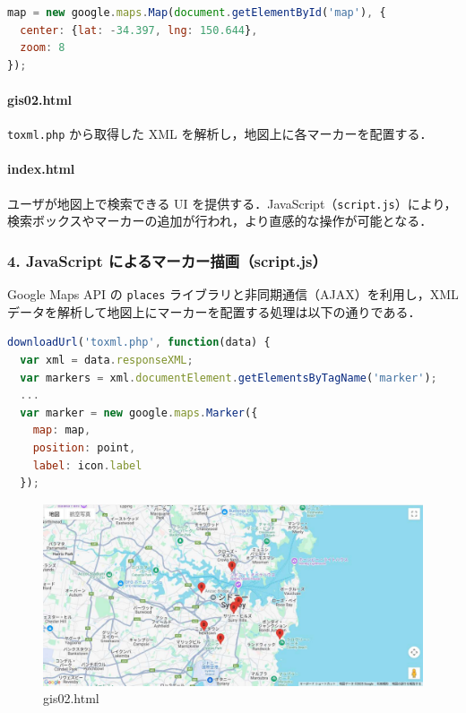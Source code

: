 \begin{lstlisting}[language=javascript]
map = new google.maps.Map(document.getElementById('map'), {
  center: {lat: -34.397, lng: 150.644},
  zoom: 8
});
\end{lstlisting}

\paragraph*{gis02.html}
\texttt{toxml.php} から取得した XML を解析し，地図上に各マーカーを配置する．

\paragraph*{index.html}
ユーザが地図上で検索できる UI を提供する．JavaScript（\texttt{script.js}）により，検索ボックスやマーカーの追加が行われ，より直感的な操作が可能となる．

\subsubsection*{4. JavaScript によるマーカー描画（script.js）}

Google Maps API の \texttt{places} ライブラリと非同期通信（AJAX）を利用し，XML データを解析して地図上にマーカーを配置する処理は以下の通りである．

\begin{lstlisting}[language=javascript]
downloadUrl('toxml.php', function(data) {
  var xml = data.responseXML;
  var markers = xml.documentElement.getElementsByTagName('marker');
  ...
  var marker = new google.maps.Marker({
    map: map,
    position: point,
    label: icon.label
  });
\end{lstlisting}

\begin{figure}[htbp]
  \centering
  \includegraphics[width=0.9\linewidth]{figure/10.pdf}
  \caption{gis02.html}
\end{figure}
